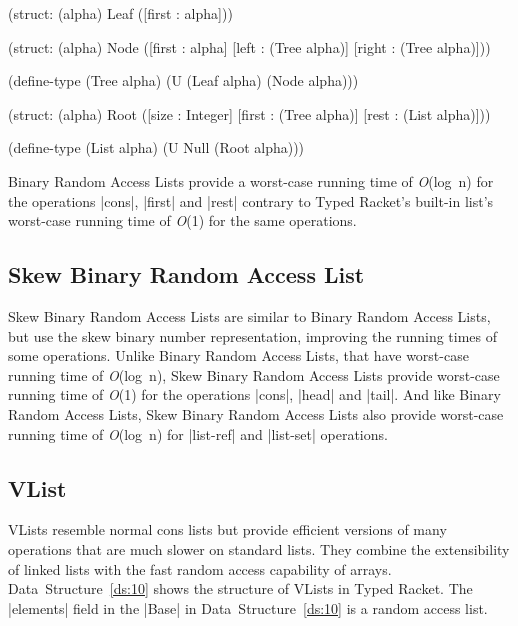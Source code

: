\begin{datastructure}
  \begin{schemedisplay}

    (struct: (alpha) Leaf ([first : alpha]))

    (struct: (alpha) Node 
      ([first  : alpha]
       [left    : (Tree alpha)] 
       [right : (Tree alpha)]))

    (define-type (Tree alpha) (U (Leaf alpha) (Node alpha)))

    (struct: (alpha) Root 
      ([size  : Integer]
       [first : (Tree alpha)]
       [rest  : (List alpha)]))

    (define-type (List alpha) (U Null (Root alpha)))

  \end{schemedisplay}
  \label{ds:9}
\end{datastructure}

\noindent
Binary Random Access Lists provide a worst-case running time of
\emph{O}(log~n) for the operations \scheme|cons|, \scheme|first| and
\scheme|rest| contrary to Typed Racket's built-in list's worst-case
running time of \emph{O}(1) for the same operations.

\subsection*{Skew Binary Random Access List}
Skew Binary Random Access Lists are similar to Binary Random Access
Lists, but use the skew binary number representation, improving the
running times of some operations. Unlike Binary Random Access Lists,
that have worst-case running time of \emph{O}(log~n), Skew Binary Random
Access Lists provide worst-case running time of \emph{O}(1) for the
operations \scheme|cons|, \scheme|head| and \scheme|tail|. And like
Binary Random Access Lists, Skew Binary Random Access Lists also provide
worst-case running time of \emph{O}(log~n) for \scheme|list-ref| and
\scheme|list-set| operations.

\subsection*{VList}
VLists \citep{bagwell-lists} resemble normal cons lists but provide
efficient versions of many operations that are much slower on standard
lists. They combine the extensibility of linked lists with the fast
random access capability of arrays. Data~Structure~\ref{ds:10} shows the
structure of VLists in Typed Racket. The \scheme|elements| field in the
\scheme|Base| in Data~Structure~\ref{ds:10} is a random access list.


